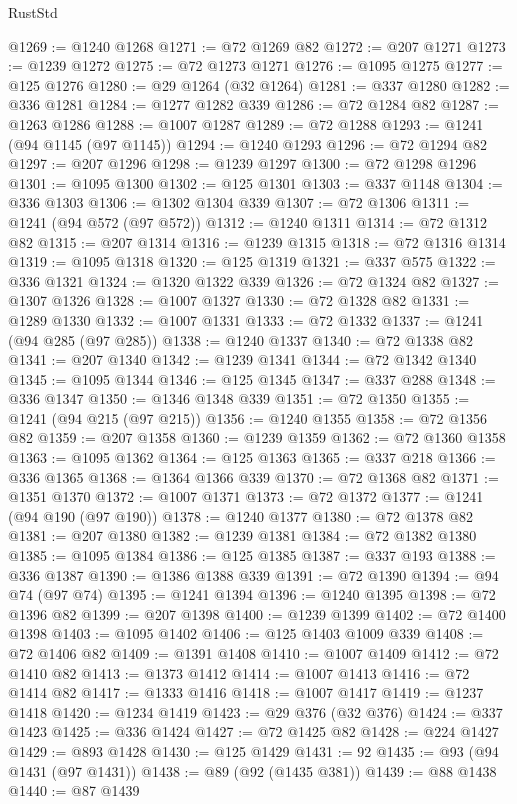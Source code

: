\begin{lexlean}{RustStd}
\begin{coremodule}
{\begin{coremodule}
{{{{{{{{{{{{{{{{{{{{{{{{{{{{{{{{{{{{{{{{{{{{{{{{{{{{{{{@1269 := @1240 @1268
@1271 := @72 @1269 @82
@1272 := @207 @1271
@1273 := @1239 @1272
@1275 := @72 @1273 @1271
@1276 := @1095 @1275
@1277 := @125 @1276
@1280 := @29 @1264 (@32 @1264)
@1281 := @337 @1280
@1282 := @336 @1281
@1284 := @1277 @1282 @339
@1286 := @72 @1284 @82
@1287 := @1263 @1286
@1288 := @1007 @1287
@1289 := @72 @1288
@1293 := @1241 (@94 @1145 (@97 @1145))
@1294 := @1240 @1293
@1296 := @72 @1294 @82
@1297 := @207 @1296
@1298 := @1239 @1297
@1300 := @72 @1298 @1296
@1301 := @1095 @1300
@1302 := @125 @1301
@1303 := @337 @1148
@1304 := @336 @1303
@1306 := @1302 @1304 @339
@1307 := @72 @1306
@1311 := @1241 (@94 @572 (@97 @572))
@1312 := @1240 @1311
@1314 := @72 @1312 @82
@1315 := @207 @1314
@1316 := @1239 @1315
@1318 := @72 @1316 @1314
@1319 := @1095 @1318
@1320 := @125 @1319
@1321 := @337 @575
@1322 := @336 @1321
@1324 := @1320 @1322 @339
@1326 := @72 @1324 @82
@1327 := @1307 @1326
@1328 := @1007 @1327
@1330 := @72 @1328 @82
@1331 := @1289 @1330
@1332 := @1007 @1331
@1333 := @72 @1332
@1337 := @1241 (@94 @285 (@97 @285))
@1338 := @1240 @1337
@1340 := @72 @1338 @82
@1341 := @207 @1340
@1342 := @1239 @1341
@1344 := @72 @1342 @1340
@1345 := @1095 @1344
@1346 := @125 @1345
@1347 := @337 @288
@1348 := @336 @1347
@1350 := @1346 @1348 @339
@1351 := @72 @1350
@1355 := @1241 (@94 @215 (@97 @215))
@1356 := @1240 @1355
@1358 := @72 @1356 @82
@1359 := @207 @1358
@1360 := @1239 @1359
@1362 := @72 @1360 @1358
@1363 := @1095 @1362
@1364 := @125 @1363
@1365 := @337 @218
@1366 := @336 @1365
@1368 := @1364 @1366 @339
@1370 := @72 @1368 @82
@1371 := @1351 @1370
@1372 := @1007 @1371
@1373 := @72 @1372
@1377 := @1241 (@94 @190 (@97 @190))
@1378 := @1240 @1377
@1380 := @72 @1378 @82
@1381 := @207 @1380
@1382 := @1239 @1381
@1384 := @72 @1382 @1380
@1385 := @1095 @1384
@1386 := @125 @1385
@1387 := @337 @193
@1388 := @336 @1387
@1390 := @1386 @1388 @339
@1391 := @72 @1390
@1394 := @94 @74 (@97 @74)
@1395 := @1241 @1394
@1396 := @1240 @1395
@1398 := @72 @1396 @82
@1399 := @207 @1398
@1400 := @1239 @1399
@1402 := @72 @1400 @1398
@1403 := @1095 @1402
@1406 := @125 @1403 @1009 @339
@1408 := @72 @1406 @82
@1409 := @1391 @1408
@1410 := @1007 @1409
@1412 := @72 @1410 @82
@1413 := @1373 @1412
@1414 := @1007 @1413
@1416 := @72 @1414 @82
@1417 := @1333 @1416
@1418 := @1007 @1417
@1419 := @1237 @1418
@1420 := @1234 @1419
@1423 := @29 @376 (@32 @376)
@1424 := @337 @1423
@1425 := @336 @1424
@1427 := @72 @1425 @82
@1428 := @224 @1427
@1429 := @893 @1428
@1430 := @125 @1429
@1431 := 92
@1435 := @93 (@94 @1431 (@97 @1431))
@1438 := @89 (@92 (@1435 @381))
@1439 := @88 @1438
@1440 := @87 @1439
}}}}}}}}}}}}}}}}}}}}}}}}}}}}}}}}}}}}}}}}}}}}}}}}}}}}}}}
\end{coremodule}}
\end{coremodule}
\end{lexlean}
